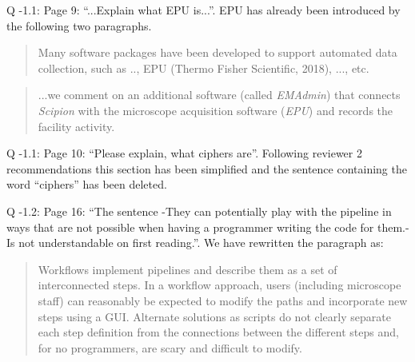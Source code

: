 \documentclass[a4paper,12pt]{article}
\def\scipion{\textit{Scipion}\xspace}
\def\emadmin{\textit{EMAdmin}\xspace}
\def\epu{\textit{EPU}\xspace}
\begin{document}
\begin{reviewer}
Q \the\numexpr\value{pointcounter}-1\relax.1: Page 9: ``...Explain what EPU is...''. EPU has already been introduced by the following two paragraphs.

\begin{quote}
 Many software packages have been developed to support automated data collection, such as 
 .., EPU (Thermo Fisher Scientific, 2018), ..., etc.
\end{quote}

\begin{quote}
...we comment on an additional software (called  \emadmin) that connects \scipion with the microscope acquisition software (\epu) and records the facility activity.
\end{quote}

Q \the\numexpr\value{pointcounter}-1\relax.1: Page 10: ``Please explain, what ciphers are''. Following reviewer 2 recommendations this section has been simplified and the sentence containing the word ``ciphers'' has been deleted. 

Q \the\numexpr\value{pointcounter}-1\relax.2: Page 16: ``The sentence -They can potentially play with the pipeline in ways that are not possible when having a programmer writing the code for them.- Is not understandable on first reading.''. We have rewritten the paragraph as:


\begin{quote}
 Workflows implement pipelines and describe them as a set of interconnected steps. In a workflow approach, users (including microscope staff) can reasonably be expected to modify the paths and incorporate new steps using a GUI. Alternate solutions as scripts do not clearly separate each step definition from the connections between the different steps and, for no programmers, are scary and difficult to modify. 
\end{quote}

\end{reviewer}
\end{document}
